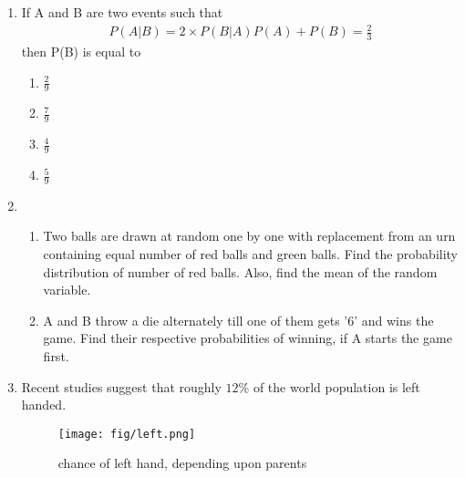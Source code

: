 \documentclass{article}
\begin{document}
\begin{enumerate}
	\item If A and B are two events such that 
		\begin{align}
			P(A|B) = 2 \times  P(B|A)P(A) + P(B)  = \frac{2}{3}
		\end{align}then P(B)  is equal to
\begin{enumerate}
\item $\frac{2}{9}$
\item $\frac{7}{9}$
\item $\frac{4}{9}$
\item $\frac{5}{9}$
\end{enumerate}

\item
\begin{enumerate}
\item Two balls are drawn at random one by one with replacement from an urn containing equal number of red balls and green balls. Find the probability distribution of number of red balls. Also, find the mean of the random variable.
\item A and B throw a die alternately till one of them gets '6' and wins the game. Find their respective probabilities of winning, if A starts the game first.
\end{enumerate}

\item Recent studies suggest that roughly $12\%$ of the world population is left handed.
	
\begin{figure}[h!]
\centering
\texttt{[image: fig/left.png]}
\caption{chance of left hand, depending upon parents}
\label{fig:left.png}
\end{figure}


\end{enumerate}
\end{document}
